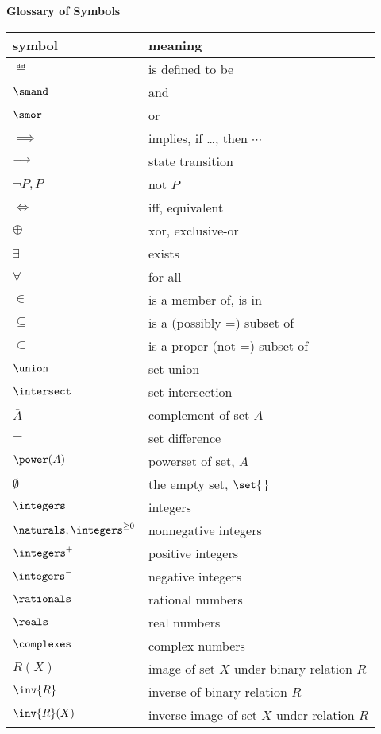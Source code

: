 
\begin{center}
\large \textbf{Glossary of Symbols}
\end{center}

\begin{center}
\begin{tabular}{ll}
symbol         &  meaning\\
\hline
$\eqdef$       & is defined to be\\
$\smand$       & and\\
$\smor$        & or\\
$\implies$     & implies, if \dots, then $\cdots$\\
$\mathrel{\longrightarrow}$     & state transition\\
$\neg P, \bar{P}$      & not $P$\\
$\iff$         & iff, equivalent\\
$\oplus$       & xor, exclusive-or\\
$\exists$      & exists\\
$\forall$      & for all\\
$\in$          & is a member of, is in\\
$\subseteq$    & is a (possibly =) subset of\\
$\subset$      & is a proper (not =) subset of\\
$\union$       & set union\\
$\intersect$   & set intersection\\
$\bar{A}$      & complement of set $A$\\
$-$            & set difference\\
$\power(A)$    & powerset of set, $A$\\
$\emptyset$    & the empty set, $\set{\,}$\\
$\integers$    & integers\\
$\naturals, \integers^{\ge 0}$    & nonnegative integers \\
$\integers^{+}$ & positive integers\\
$\integers^{-}$ & negative integers\\
$\rationals$   & rational numbers\\
$\reals$       & real numbers\\
$\complexes$   & complex numbers\\
$R(X)$         & image of set $X$ under binary relation $R$\\
$\inv{R}$      & inverse of binary relation $R$\\
$\inv{R}(X)$   & inverse image of set $X$ under relation $R$

\end{tabular}
\end{center}

